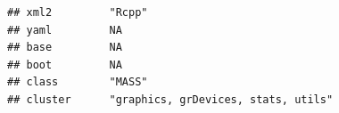 \documentclass[]{article}
\begin{document}
\begin{verbatim}
## xml2         "Rcpp"                                                                                                                                                                                                                                                                                                                                                                                                                                                                                
## yaml         NA                                                                                                                                                                                                                                                                                                                                                                                                                                                                                    
## base         NA                                                                                                                                                                                                                                                                                                                                                                                                                                                                                    
## boot         NA                                                                                                                                                                                                                                                                                                                                                                                                                                                                                    
## class        "MASS"                                                                                                                                                                                                                                                                                                                                                                                                                                                                                
## cluster      "graphics, grDevices, stats, utils"                                                                                                                                                                                                                                                                                                                                                                                                                                                   

\end{verbatim}
\end{document}
